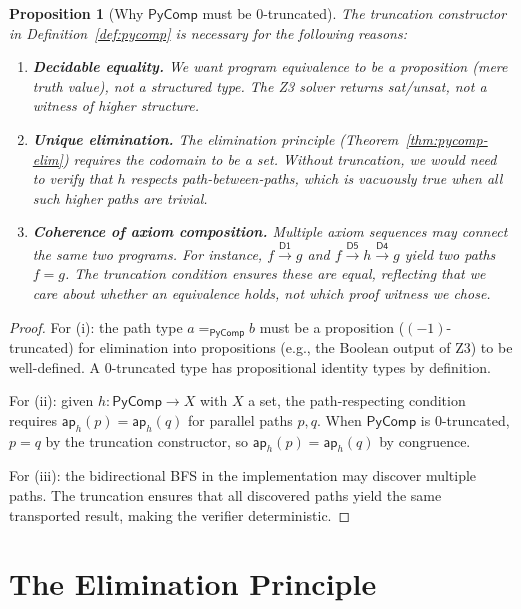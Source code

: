\documentclass[11pt,a4paper]{report}
\theoremstyle{definition}
\theoremstyle{plain}
\newtheorem{proposition}[definition]{Proposition}
\begin{document}
\begin{proposition}[Why $\mathsf{PyComp}$ must be 0-truncated]
\label{prop:truncation-needed}
The truncation constructor in Definition~\ref{def:pycomp} is necessary
for the following reasons:
\begin{enumerate}[label=(\roman*)]
  \item \textbf{Decidable equality.} We want program equivalence to be
    a \emph{proposition} (mere truth value), not a structured type.
    The Z3 solver returns \textsf{sat}/\textsf{unsat}, not a witness
    of higher structure.

  \item \textbf{Unique elimination.} The elimination principle
    (Theorem~\ref{thm:pycomp-elim}) requires the codomain to be a set.
    Without truncation, we would need to verify that $h$ respects
    path-between-paths, which is vacuously true when all such higher
    paths are trivial.

  \item \textbf{Coherence of axiom composition.}
    Multiple axiom sequences may connect the same two programs.
    For instance, $f \xrightarrow{\mathsf{D1}} g$ and
    $f \xrightarrow{\mathsf{D5}} h \xrightarrow{\mathsf{D4}} g$
    yield two paths $f = g$.  The truncation condition ensures these are
    equal, reflecting that we care about \emph{whether} an equivalence
    holds, not \emph{which} proof witness we chose.
\end{enumerate}
\end{proposition}

\begin{proof}
For (i): the path type $a =_{\mathsf{PyComp}} b$ must be a proposition
($(-1)$-truncated) for elimination into propositions (e.g., the Boolean
output of Z3) to be well-defined.  A 0-truncated type has propositional
identity types by definition.

For (ii): given $h : \mathsf{PyComp} \to X$ with $X$ a set,
the path-respecting condition requires
$\mathsf{ap}_h(p) = \mathsf{ap}_h(q)$ for parallel paths $p, q$.
When $\mathsf{PyComp}$ is 0-truncated, $p = q$ by the truncation
constructor, so $\mathsf{ap}_h(p) = \mathsf{ap}_h(q)$ by congruence.

For (iii): the bidirectional BFS in the implementation may discover
multiple paths.  The truncation ensures that all discovered paths
yield the same transported result, making the verifier deterministic.
\end{proof}

\section{The Elimination Principle}
\end{document}
